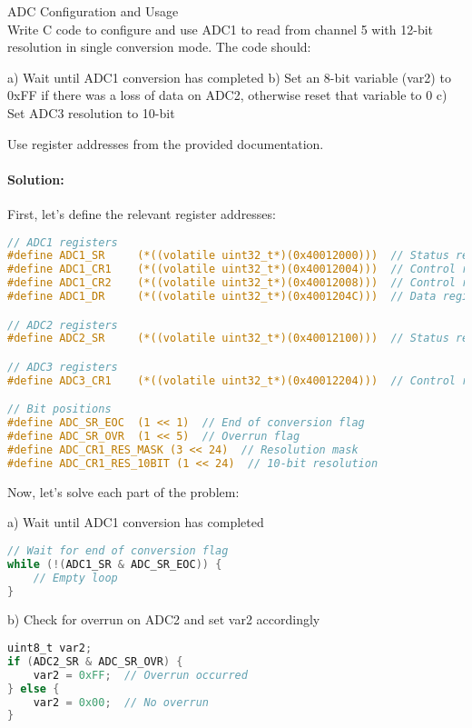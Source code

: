 \begin{example2}{ADC Configuration and Usage}\\
Write C code to configure and use ADC1 to read from channel 5 with 12-bit resolution in single conversion mode. The code should:

a) Wait until ADC1 conversion has completed
b) Set an 8-bit variable (var2) to 0xFF if there was a loss of data on ADC2, otherwise reset that variable to 0
c) Set ADC3 resolution to 10-bit

Use register addresses from the provided documentation.

\tcblower
\paragraph{Solution:}
First, let's define the relevant register addresses:
\begin{lstlisting}[language=C, style=basesmol]
// ADC1 registers
#define ADC1_SR     (*((volatile uint32_t*)(0x40012000)))  // Status register
#define ADC1_CR1    (*((volatile uint32_t*)(0x40012004)))  // Control register 1
#define ADC1_CR2    (*((volatile uint32_t*)(0x40012008)))  // Control register 2
#define ADC1_DR     (*((volatile uint32_t*)(0x4001204C)))  // Data register

// ADC2 registers
#define ADC2_SR     (*((volatile uint32_t*)(0x40012100)))  // Status register

// ADC3 registers
#define ADC3_CR1    (*((volatile uint32_t*)(0x40012204)))  // Control register 1

// Bit positions
#define ADC_SR_EOC  (1 << 1)  // End of conversion flag
#define ADC_SR_OVR  (1 << 5)  // Overrun flag
#define ADC_CR1_RES_MASK (3 << 24)  // Resolution mask
#define ADC_CR1_RES_10BIT (1 << 24)  // 10-bit resolution
\end{lstlisting}

Now, let's solve each part of the problem:

a) Wait until ADC1 conversion has completed
\begin{lstlisting}[language=C, style=basesmol]
// Wait for end of conversion flag
while (!(ADC1_SR & ADC_SR_EOC)) {
    // Empty loop
}
\end{lstlisting}

b) Check for overrun on ADC2 and set var2 accordingly
\begin{lstlisting}[language=C, style=basesmol]
uint8_t var2;
if (ADC2_SR & ADC_SR_OVR) {
    var2 = 0xFF;  // Overrun occurred
} else {
    var2 = 0x00;  // No overrun
}
\end{lstlisting}


\end{example2}
